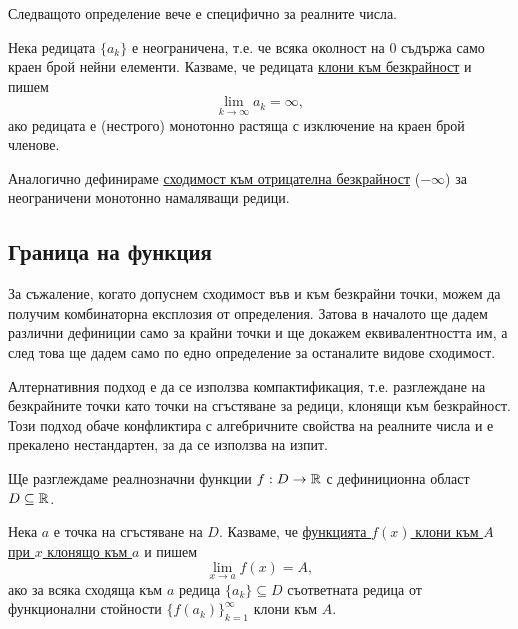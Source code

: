 \documentclass[numbers=endperiod, DIV=15, bibliography=totocnumbered]{scrartcl}
\begin{document}
\begin{note}
  Следващото определение вече е специфично за реалните числа.
\end{note}

\begin{definition}
  Нека редицата $\{ a_k \}$ е неограничена, т.е. че всяка околност на $0$ съдържа само краен брой нейни елементи. Казваме, че редицата \uline{клони към безкрайност} и пишем
  \begin{displaymath}
    \lim_{k \to \infty} a_k = \infty,
  \end{displaymath}
  ако редицата е (нестрого) монотонно растяща с изключение на краен брой членове.

  Аналогично дефинираме \uline{сходимост към отрицателна безкрайност} ($-\infty$) за неограничени монотонно намаляващи редици.
\end{definition}

\subsection{Граница на функция}

\begin{note}
  За съжаление, когато допуснем сходимост във и към безкрайни точки, можем да получим комбинаторна експлозия от определения. Затова в началото ще дадем различни дефиниции само за крайни точки и ще докажем еквивалентността им, а след това ще дадем само по едно определение за останалите видове сходимост.

  Алтернативния подход е да се използва компактификация, т.е. разглеждане на безкрайните точки като точки на сгъстяване за редици, клонящи към безкрайност. Този подход обаче конфликтира с алгебричните свойства на реалните числа и е прекалено нестандартен, за да се използва на изпит.
\end{note}

Ще разглеждаме реалнозначни функции $f: D \to \mathbb{R}$ с дефиниционна област $D \subseteq \mathbb{R}$.

\begin{definition}
  Нека $a$ е точка на сгъстяване на $D$. Казваме, че \uline{функцията $f(x)$ клони към $A$ при $x$ клонящо към $a$} и пишем
  \begin{displaymath}
    \lim_{x \to a} f(x) = A,
  \end{displaymath}
  ако за всяка сходяща към $a$ редица $\{ a_k \} \subseteq D$ съответната редица от функционални стойности ${\{ f(a_k) \}}_{k=1}^\infty$ клони към $A$.
\end{definition}
\end{document}
